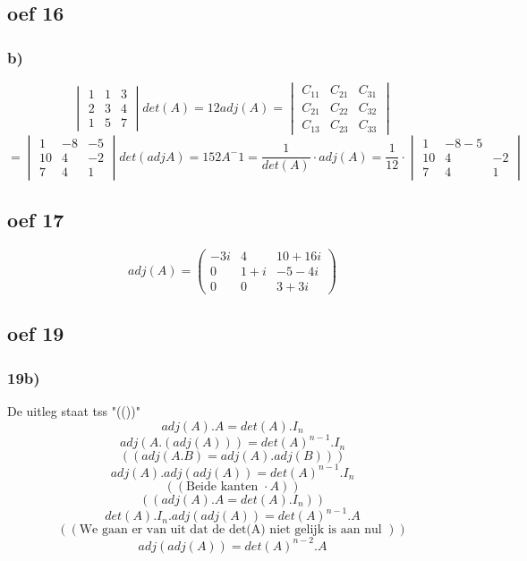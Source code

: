 \documentclass[lineaire_algebra_oplossingen.tex]{subfiles}
\begin{document}
\subsection{oef 16}
\subsubsection*{b)}
\[
\begin{vmatrix}
1 & 1 & 3\\
2 & 3 & 4\\
1 & 5 & 7
\end{vmatrix}
det(A) = 12
adj(A) =
\begin{vmatrix}
C_{11} & C_{21} & C_{31}\\
C_{21} & C_{22} & C_{32}\\
C_{13} & C_{23} & C_{33}
\end{vmatrix}
\]
\[
= 
\begin{vmatrix}
1 & -8 & -5\\
10 & 4 & -2\\
7 & 4 & 1
\end{vmatrix}
det(adj A) = 152
A^-1 = \frac{1}{det(A)} \cdot adj(A)
	 = \frac{1}{12} \cdot \begin{vmatrix}
	 						1 & -8	-5\\
	 						10 & 4 & -2\\
	 						7 & 4 & 1
	 					  \end{vmatrix}
\]


\subsection{oef 17}
\[
adj(A)=
\begin{pmatrix}
-3i & 4 & 10+16i\\
0 & 1+i & -5-4i\\
0 & 0 & 3+3i
\end{pmatrix}
\]

\subsection{oef 19}
\subsubsection*{19b)}
De uitleg staat tss "(())"
\[adj(A).A = det(A).I_{n}\]
\[adj(A.(adj(A))) = det(A)^{n-1}.I_{n}\]
\[((adj(A.B)=adj(A).adj(B)))\]
\[adj(A).adj(adj(A)) = det(A)^{n-1}.I_{n}\] 
\[(( \text{Beide kanten } \cdot A )) \]
\[(( adj(A).A = det(A).I_{n} )) \]
\[det(A).I_{n}.adj(adj(A)) = det(A)^{n-1}.A\]
\[((\text{We gaan er van uit dat de det(A) niet gelijk is aan nul }))\]
\[adj(adj(A)) = det(A)^{n-2}.A\]
\end{document}
